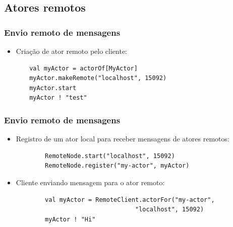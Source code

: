 \documentclass{beamer}
\begin{document}
\subsection{Atores remotos}
\begin{frame}[fragile]
\frametitle{Envio remoto de mensagens}
	\begin{itemize}
		\item Cria\c{c}\~ao de ator remoto pelo cliente:
	\end{itemize}
	\begin{verbatim}
	   val myActor = actorOf[MyActor]
	   myActor.makeRemote("localhost", 15092)
	   myActor.start
	   myActor ! "test"
	\end{verbatim}
\end{frame}
\begin{frame}[fragile]
\frametitle{Envio remoto de mensagens}
	\begin{itemize}
		\item Registro de um ator local para receber mensagens de atores remotos:
	\begin{verbatim}
		RemoteNode.start("localhost", 15092)
		RemoteNode.register("my-actor", myActor)
	\end{verbatim}
	\item Cliente enviando mensagem para o ator remoto:
	\begin{verbatim}
		val myActor = RemoteClient.actorFor("my-actor", 
                                 "localhost", 15092)
		myActor ! "Hi"
	\end{verbatim}
	\end{itemize}
\end{frame}
\end{document}
